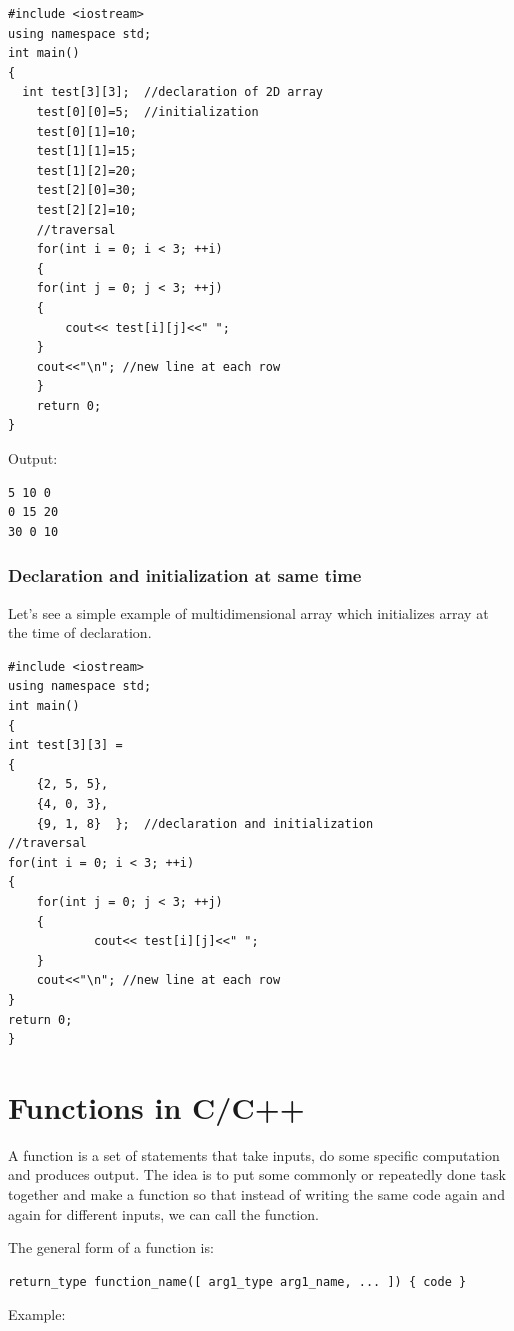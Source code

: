 \documentclass{book}
\begin{document}
\begin{lstlisting}
#include <iostream>  
using namespace std;  
int main()  
{  
  int test[3][3];  //declaration of 2D array
	test[0][0]=5;  //initialization
	test[0][1]=10;   
	test[1][1]=15;  
	test[1][2]=20;  
	test[2][0]=30;  
	test[2][2]=10;  
	//traversal    
	for(int i = 0; i < 3; ++i)  
	{  
	for(int j = 0; j < 3; ++j)  
	{  
		cout<< test[i][j]<<" ";  
	}  
	cout<<"\n"; //new line at each row   
	}  
	return 0;  
}
\end{lstlisting}
  
Output:

\begin{lstlisting}
5 10 0 
0 15 20 
30 0 10 
\end{lstlisting}

\subsubsection{Declaration and initialization at same time}

Let's see a simple example of multidimensional array which initializes array at the time of declaration.

\begin{lstlisting}
#include <iostream>  
using namespace std;  
int main()  
{  
int test[3][3] =  
{  
	{2, 5, 5},  
	{4, 0, 3},  
	{9, 1, 8}  };  //declaration and initialization    
//traversal    
for(int i = 0; i < 3; ++i)  
{  
	for(int j = 0; j < 3; ++j)  
	{  
			cout<< test[i][j]<<" ";  
	}  
	cout<<"\n"; //new line at each row   
}  
return 0;  
}  
\end{lstlisting}

\section{Functions in C/C++}

A function is a set of statements that take inputs, do some specific computation and produces output. The idea is to put some commonly or repeatedly done task together and make a function so that instead of writing the same code again and again for different inputs, we can call the function.

The general form of a function is:

\begin{lstlisting}
return_type function_name([ arg1_type arg1_name, ... ]) { code }
\end{lstlisting}

Example:
\end{document}
